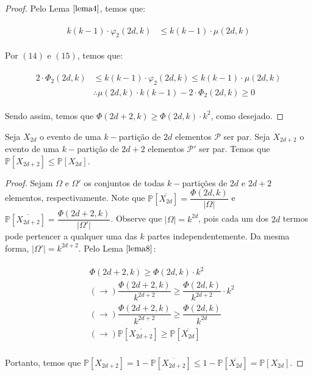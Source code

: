 \documentclass[12pt]{article}
\begin{document}
\begin{proof}
  	Pelo Lema $\ref{lema4}$, temos que: 
  	
  	\begin{align}
  		\begin{split}
  			k(k-1) \cdot \varphi_2(2d, k) &\leq k(k-1) \cdot \mu(2d, k)
  		\end{split} 
  	\end{align}  
  	
  	Por $(14)$ e $(15)$, temos que:
  	
  	\begin{align}
  		\begin{split}
  			2 \cdot \Phi_2(2d, k) & \leq k(k-1) \cdot \varphi_2(2d, k) \leq k(k-1) \cdot \mu(2d, k) \\
  			& \therefore \mu(2d, k)\cdot k  (k-1) - 2 \cdot \Phi_2(2d, k) \geq 0
  		\end{split} 
  	\end{align} 
  	
  	Sendo assim, temos que $\Phi(2d+2, k) \geq \Phi(2d, k) \cdot k^2$, como desejado.
  	
  \end{proof} \newl
  
  
  \begin{lema}  
  	\label{lema9} 
  	Seja $X_{2d}$ o evento de uma $k-$partição de $2d$ elementos $\mathcal{P}$ ser par. Seja $X_{2d+2}$ o evento de uma $k-$partição de $2d + 2$ elementos $\mathcal{P'}$ ser par. Temos que $\mathds{P}[X_{2d+2}] \leq \mathds{P}[X_{2d}]$.
  \end{lema}
  
  \begin{proof} 
  	
  		Sejam $\Omega$ e $\Omega'$ os conjuntos de todas $k-$partições de $2d$ e $2d+2$ elementos, respectivamente. Note que $\mathds{P}[\overline{X_{2d}}] = \dfrac{\Phi(2d, k)}{|\Omega|}$ e $\mathds{P}[\overline{X_{2d+2}}] = \dfrac{\Phi(2d+2, k)}{|\Omega'|}$. Observe que $|\Omega| = k^{2d}$, pois cada um dos $2d$ termos pode pertencer a qualquer uma das $k$ partes independentemente. Da mesma forma, $|\Omega'| = k^{2d + 2}$. Pelo Lema $\ref{lema8}$:
  	
  	\begin{align}
  		\begin{split}
  		  &	\Phi(2d+2, k) \geq \Phi(2d, k) \cdot k^2 \\
  		  & (\rightarrow) \dfrac{\Phi(2d+2, k)}{k^{2d+2}}	 \geq \dfrac{\Phi(2d, k)}{k^{2d+2}}	 \cdot k^2 \\
  		  & (\rightarrow) \dfrac{\Phi(2d+2, k)}{k^{2d+2}}	 \geq \dfrac{\Phi(2d, k)}{k^{2d}}\\
  		  & (\rightarrow) \mathds{P}[\overline{X_{2d+2}}] \geq \mathds{P}[\overline{X_{2d}}]\\
  		\end{split} 
  	\end{align}
  	
  	 Portanto, temos que $\mathds{P}[{X_{2d+2}}] = 1 - \mathds{P}[\overline{X_{2d+2}}] \leq 1 - \mathds{P}[\overline{X_{2d}}] = \mathds{P}[{X_{2d}}]$.
  	
  \end{proof}\newl 
 
\end{document}
